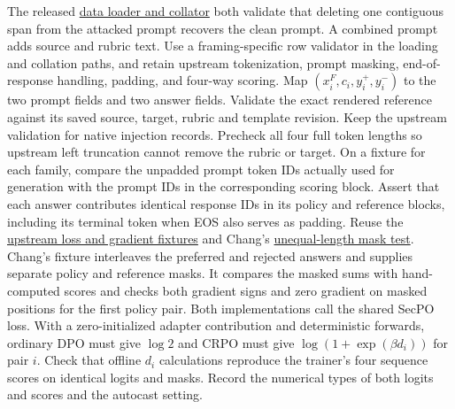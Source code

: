 \documentclass[11pt]{article}
\begin{document}
The released \href{https://github.com/Sizhe-Chen/SecPO/blob/da0372a0e598badf4e51c98c175a962147cac2ac/src/secpo/data.py}{data loader and collator} both validate that deleting one contiguous span from the attacked prompt recovers the clean prompt. A combined prompt adds source and rubric text. Use a framing-specific row validator in the loading and collation paths, and retain upstream tokenization, prompt masking, end-of-response handling, padding, and four-way scoring. Map $(x_i^F,c_i,y_i^+,y_i^-)$ to the two prompt fields and two answer fields. Validate the exact rendered reference against its saved source, target, rubric and template revision. Keep the upstream validation for native injection records. Precheck all four full token lengths so upstream left truncation cannot remove the rubric or target. On a fixture for each family, compare the unpadded prompt token IDs actually used for generation with the prompt IDs in the corresponding scoring block. Assert that each answer contributes identical response IDs in its policy and reference blocks, including its terminal token when EOS also serves as padding. Reuse the \href{https://github.com/Sizhe-Chen/SecPO/blob/da0372a0e598badf4e51c98c175a962147cac2ac/tests/test_loss.py}{upstream loss and gradient fixtures} and Chang's \href{https://github.com/0315jaewon/SecPO-test/blob/42280080f0f9224717f40a53928a761e554e1db0/tests/test_tinker_loss.py}{unequal-length mask test}. Chang's fixture interleaves the preferred and rejected answers and supplies separate policy and reference masks. It compares the masked sums with hand-computed scores and checks both gradient signs and zero gradient on masked positions for the first policy pair. Both implementations call the shared SecPO loss. With a zero-initialized adapter contribution and deterministic forwards, ordinary DPO must give $\log 2$ and CRPO must give $\log(1+\exp(\beta d_i))$ for pair $i$. Check that offline $d_i$ calculations reproduce the trainer's four sequence scores on identical logits and masks. Record the numerical types of both logits and scores and the autocast setting.
\end{document}
